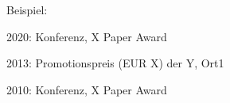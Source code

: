 \documentclass[checked=true,walterbenjamin=false]{dfg-cv-en}
\begin{document}
\secAnerkennung \optionaltext %

\noindent Beispiel:
\begin{compactItemize}
\item 2020: Konferenz, X Paper Award
\item 2013: Promotionspreis (EUR X) der Y, Ort1
\item 2010: Konferenz, X Paper Award
\end{compactItemize}


\secSonstiges \optionaltext %
\end{document}
